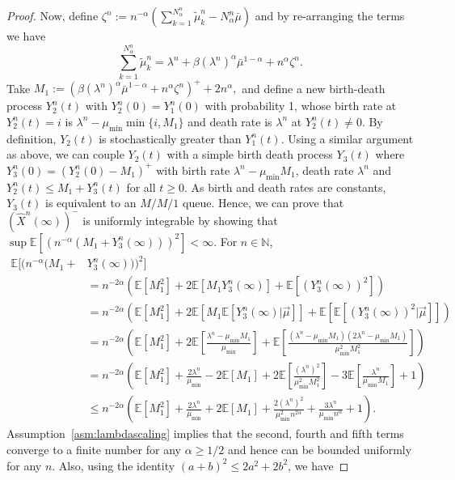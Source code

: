 \documentclass[a4paper,11pt,twoside]{article}
\numberwithin{equation}{section}
\numberwithin{figure}{section}
\theoremstyle{plain}
\newcommand{\EE}{\mathbb{E}}
\newcommand{\NN}{\mathbb{N}}
\newcommand{\1}{\mathbbm{1}}
\begin{document}
\begin{proof}
Now, define $\zeta^n:=n^{-\alpha}\left(\sum_{k=1}^{N^n_\alpha}\tilde{\mu}_k^n-N^n_\alpha \bar{\mu}\right)$ and by re-arranging the terms we have
\[
\sum_{k=1}^{N^n_\alpha}\tilde{\mu}_k^n=\lambda^n+\beta\left(\lambda^n\right)^\alpha\bar{\mu}^{1-\alpha}+n^\alpha \zeta^n.
\]
Take $M_1:=(\beta\left(\lambda^n\right)^\alpha\bar{\mu}^{1-\alpha}+n^\alpha \zeta^n)^++2n^\alpha,$ and define a new birth-death process $Y_2^n(t)$ with $Y_2^n(0)=Y_1^n(0)$ with probability 1, whose birth rate at $Y_2^n(t)=i$ is $\lambda^n-\mu_{\min}\min\{i,M_1\}$ and death rate is $\lambda^n$ at $Y_2^n(t)\neq 0$. By definition, $Y_2(t)$ is stochastically greater than $Y_1^n(t)$. Using a similar argument as above, we can couple $Y_2(t)$ with a simple birth death process  $Y_3(t)$ where $Y_3^n(0)=(Y_2^n(0)-M_1)^+$ with birth rate $\lambda^n-\mu_{\min}M_1$, death rate $\lambda^n$ and $Y_2^n(t)\leq M_1+Y_3^n(t)$ for all $t\geq 0$. As birth and death rates are constants, $Y_3(t)$ is equivalent to an $M/M/1$ queue. Hence, we can prove that $\left(\hat{X}^n(\infty)\right)^-$ is uniformly integrable by showing that $\sup\EE\left[\left(n^{-\alpha}(M_1+Y_3^n(\infty))\right)^2\right]<\infty$. For $n\in \NN$,
\begin{align*}
    \EE\Big[\Big(n^{-\alpha}(M_1+
    &Y_3^n(\infty))\Big)^2\Big]
    \\    &=n^{-2\alpha}\left(\EE[M_1^2]+2\EE[M_1Y_3^n(\infty)]+\EE\left[\left(Y_3^n(\infty)\right)^2\right]\right)
    \\    &=n^{-2\alpha} \left(\EE\left[M_1^2\right]+2\EE\left[M_1\EE[Y_3^n(\infty)|\vec{\mu}]\right]+\EE\left[\EE\left[\left(Y_3^n(\infty)\right)^2|\vec{\mu}\right]\right]\right)\\
    &=n^{-2\alpha}\left(\EE\left[M_1^2\right]+2\EE\left[\frac{\lambda^n-\mu_{\min}M_1}{\mu_{\min}}\right]+\EE\left[\frac{(\lambda^n-\mu_{\min} M_1)(2\lambda^n-\mu_{\min}M_1)
    }{\mu_{\min}^2M_1^2}\right]\right)\\
    &=n^{-2\alpha}\left(\EE\left[M_1^2\right]+\frac{2\lambda^n}{\mu_{\min}}-2\EE\left[M_1\right]+2\EE\left[\frac{(\lambda^n)^2}{\mu_{\min}^2M_1^2}\right]-3\EE\left[\frac{\lambda^n}{\mu_{\min}M_1}\right]+1\right)\\
    &\leq n^{-2\alpha}\left(\EE\left[M_1^2\right]+\frac{2\lambda^n}{\mu_{\min}}+2\EE\left[M_1\right]+\frac{2(\lambda^n)^2}{\mu_{\min}^2n^{2\alpha}}+\frac{3\lambda^n}{\mu_{\min}n^\alpha}+1\right).
\end{align*}
Assumption~\ref{asm:lambdascaling} implies that the second, fourth and fifth terms converge to a finite number for any $\alpha\geq 1/2$ and hence can be bounded uniformly for any $n$. Also, using the identity $(a+b)^2\leq 2a^2+2b^2$, we have

\end{proof}
\end{document}
